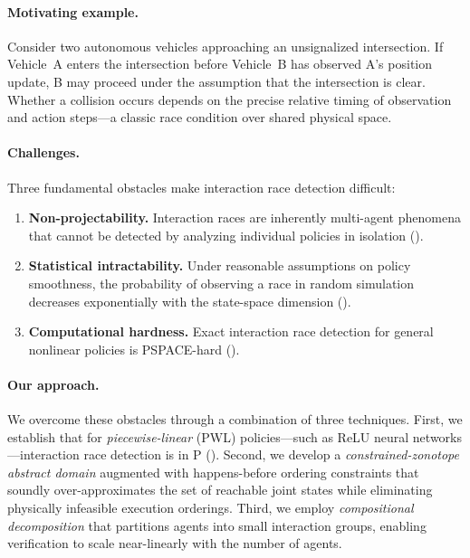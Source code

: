 \documentclass[11pt]{article}
\begin{document}
\paragraph{Motivating example.}
Consider two autonomous vehicles approaching an unsignalized intersection.
If Vehicle~A enters the intersection before Vehicle~B has observed A's position
update, B may proceed under the assumption that the intersection is clear.
Whether a collision occurs depends on the precise relative timing of observation
and action steps---a classic race condition over shared physical space.

\paragraph{Challenges.}
Three fundamental obstacles make interaction race detection difficult:
\begin{enumerate}[leftmargin=*,nosep]
\item \textbf{Non-projectability.} Interaction races are inherently multi-agent
phenomena that cannot be detected by analyzing individual policies in isolation
().
\item \textbf{Statistical intractability.} Under reasonable assumptions on
policy smoothness, the probability of observing a race in random simulation
decreases exponentially with the state-space dimension ().
\item \textbf{Computational hardness.} Exact interaction race detection for
general nonlinear policies is PSPACE-hard ().
\end{enumerate}

\paragraph{Our approach.}
We overcome these obstacles through a combination of three techniques.
First, we establish that for \emph{piecewise-linear} (PWL) policies---such
as ReLU neural networks---interaction race detection is in P ().
Second, we develop a \emph{constrained-zonotope abstract domain} augmented with
happens-before ordering constraints that soundly over-approximates the set of
reachable joint states while eliminating physically infeasible execution orderings.
Third, we employ \emph{compositional decomposition} that partitions agents into
small interaction groups, enabling verification to scale near-linearly with
the number of agents.
\end{document}
